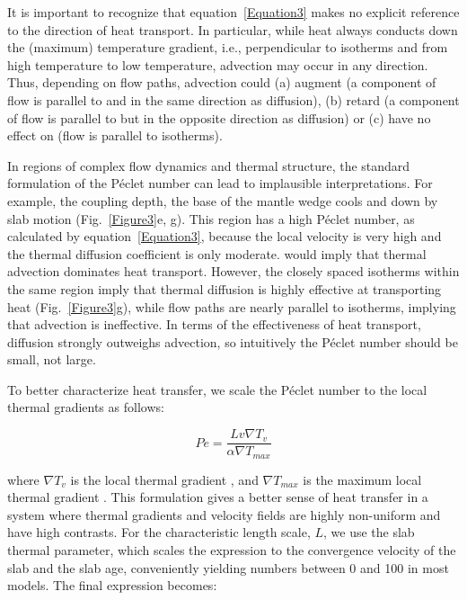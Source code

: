 \documentclass[draft]{agujournal2019}
\begin{document}
It is important to recognize that equation~\ref{Equation3} makes no explicit reference to the direction of heat transport. In particular, while heat always conducts down the (maximum) temperature gradient, i.e., perpendicular to isotherms and from high temperature to low temperature, advection may occur in any direction. Thus, depending on flow paths, advection could (a) augment  (a component of flow is parallel to and in the same direction as diffusion), (b) retard  (a component of flow is parallel to but in the opposite direction as diffusion) or (c) have no effect on  (flow is parallel to isotherms).

In regions of complex flow dynamics and thermal structure, the standard formulation of the P\'{e}clet number can lead to implausible interpretations. For example,  the coupling depth, the base of the mantle wedge cools and  down by slab motion (Fig.~\ref{Figure3}e, g). This region has a high P\'{e}clet number, as calculated by equation~\ref{Equation3}, because the local velocity is very high and the thermal diffusion coefficient is only moderate.  would imply that thermal advection dominates heat transport. However, the closely spaced isotherms  within the same region imply that thermal diffusion is highly effective at transporting heat (Fig.~\ref{Figure3}g), while flow paths are nearly parallel to isotherms, implying that advection is ineffective. In terms of the effectiveness of heat transport, diffusion strongly outweighs advection, so intuitively the P\'{e}clet number should be small, not large.

To better characterize heat transfer, we scale the P\'{e}clet number to the local thermal gradients as follows:

\begin{equation}
 Pe=\frac{Lv\nabla T_v}{\alpha\nabla T_{max}}
 \label{Equation4}
\end{equation}

where $\nabla T_v$ is the local thermal gradient , and $\nabla T_{max}$ is the maximum local thermal gradient . This formulation gives a better sense of heat transfer in a system where thermal gradients and velocity fields are highly non-uniform and have high contrasts. For the characteristic length scale, $L$, we use the slab thermal parameter, which scales the expression to the convergence velocity of the slab and the slab age, conveniently yielding numbers between 0 and 100  in most models. The final expression becomes:
\end{document}
